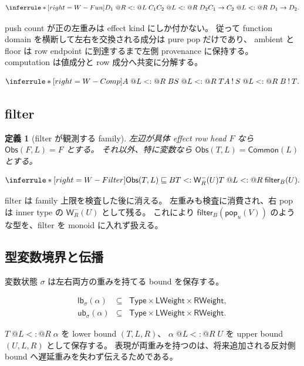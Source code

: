 \documentclass[uplatex,dvipdfmx,a4paper,10.5pt]{jsarticle}
\makeatletter
\theoremstyle{jpplain}
\newtheorem{definition}{定義}[section]
\newcommand{\lb}{\mathsf{lb}}
\newcommand{\ub}{\mathsf{ub}}
\newcommand{\Common}{\mathsf{Common}}
\newcommand{\Obs}{\mathsf{Obs}}
\newcommand{\Filter}[2]{\mathsf{filter}_{#1}(#2)}
\newcommand{\NWeight}[2]{\mathsf{W}^{-}_{#1}(#2)}
\newcommand{\popop}[1]{\mathsf{pop}_{#1}}
\newcommand{\comp}{\mathbin{!}}
\newcommand{\wsub}[4]{#1\;@#2\mathrel{<:}@#3\;#4}
\newcommand{\subty}[2]{#1\mathrel{<:}#2}
\newcommand{\fsub}[2]{#1\mathrel{\sqsubseteq}#2}
\makeatother
\begin{document}
\[
\inferrule*[right=W-Fun]
 {\wsub{D_1}{R}{L}{C_1}\\
  \wsub{C_2}{L}{R}{D_2}}
 {\wsub{C_1\to C_2}{L}{R}{D_1\to D_2}}.
\]

push count が正の左重みは effect kind にしか付かない。
従って function domain を横断して左右を交換される成分は pure pop だけであり、
ambient と floor は row endpoint に到達するまで左側 provenance に保持する。
computation は値成分と row 成分へ共変に分解する。

\[
\inferrule*[right=W-Comp]
 {\wsub{A}{L}{R}{B}\\\wsub{S}{L}{R}{T}}
 {\wsub{A\comp S}{L}{R}{B\comp T}}.
\]


\subsection{filter}

\begin{definition}[filter が観測する family]
左辺が具体 effect row head $F$ なら
$\Obs(F,L)=F$ とする。
それ以外、特に変数なら
$\Obs(T,L)=\Common(L)$ とする。
\end{definition}

\[
\inferrule*[right=W-Filter]
 {\fsub{\Obs(T,L)}{B}\\
  \subty{T}{\NWeight{R}{U}}}
 {\wsub{T}{L}{R}{\Filter{B}{U}}}.
\]

filter は family 上限を検査した後に消える。
左重みも検査に消費され、右 pop は inner type の $\NWeight{R}{U}$ として残る。
これにより $\Filter{B}{\popop{u}(V)}$ のような型を、filter を monoid に入れず扱える。

\subsection{型変数境界と伝播}

変数状態 $\sigma$ は左右両方の重みを持てる bound を保存する。

\[
\begin{array}{rcl}
\lb_\sigma(\alpha)&\subseteq&\mathsf{Type}\times\mathsf{LWeight}\times\mathsf{RWeight},\\
\ub_\sigma(\alpha)&\subseteq&\mathsf{Type}\times\mathsf{LWeight}\times\mathsf{RWeight}.
\end{array}
\]

$\wsub{T}{L}{R}{\alpha}$ を lower bound $(T,L,R)$、
$\wsub{\alpha}{L}{R}{U}$ を upper bound $(U,L,R)$ として保存する。
表現が両重みを持つのは、将来追加される反対側 bound へ遅延重みを失わず伝えるためである。
\end{document}
